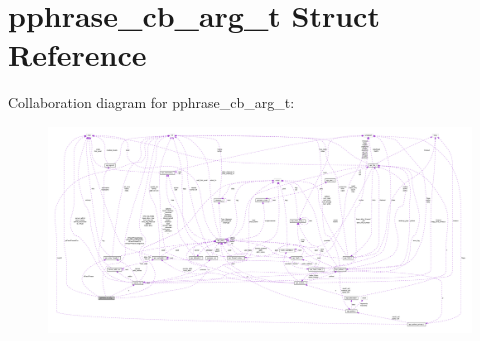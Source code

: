 \hypertarget{structpphrase__cb__arg__t}{}\section{pphrase\+\_\+cb\+\_\+arg\+\_\+t Struct Reference}
\label{structpphrase__cb__arg__t}


Collaboration diagram for pphrase\+\_\+cb\+\_\+arg\+\_\+t\+:
\nopagebreak
\begin{figure}[H]
\begin{center}
\leavevmode
\includegraphics[width=350pt]{structpphrase__cb__arg__t__coll__graph}
\end{center}
\end{figure}
